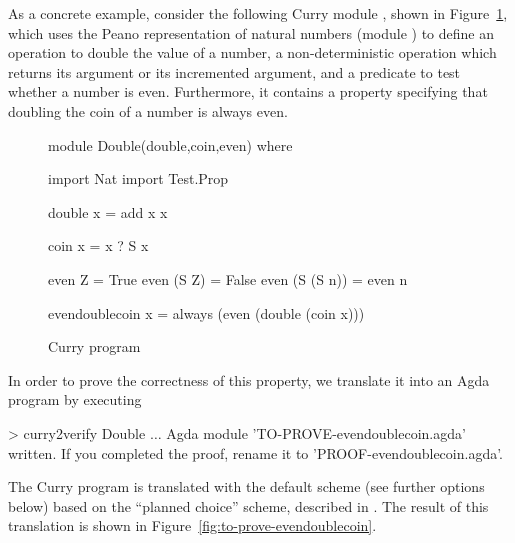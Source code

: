 As a concrete example, consider the following Curry module ,
shown in Figure~\ref{fig:double-curry},
which uses the Peano representation of natural numbers
(module ) to define an operation to double the value
of a number, a non-deterministic operation 
which returns its argument or its incremented argument,
and a predicate to test whether a number is even.
Furthermore, it contains a property specifying that
doubling the coin of a number is always even.

\begin{figure}[t]
\begin{curry}

module Double(double,coin,even) where

import Nat
import Test.Prop

double x = add x x

coin x = x ? S x

even Z         = True
even (S Z)     = False
even (S (S n)) = even n

evendoublecoin x = always (even (double (coin x)))

\end{curry}
\caption{Curry program \label{fig:double-curry}}
\end{figure}

In order to prove the correctness of this property,
we translate it into an Agda program by executing
%
\begin{curry}
> curry2verify Double
$\ldots$
Agda module 'TO-PROVE-evendoublecoin.agda' written.
If you completed the proof, rename it to 'PROOF-evendoublecoin.agda'.
\end{curry}
%
The Curry program is translated with
the default scheme (see further options below) based on
the ``planned choice'' scheme, described in \cite{AntoyHanusLibby16}.
The result of this translation is shown in
Figure~\ref{fig:to-prove-evendoublecoin}.

